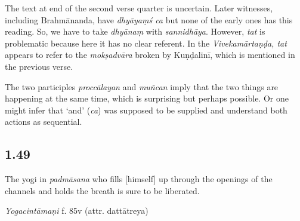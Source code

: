 \begin{ekdosis}
\begin{testimonia}[hp01_048]
\end{testimonia}

\begin{philcomm}[hp01_048]

The text at end of the second verse quarter is uncertain. Later witnesses, including Brahmānanda, have \emph{dhyāyaṃś ca} but none of the early ones has this reading. So, we have to take \emph{dhyānaṃ} with \emph{sannidhāya}. However, \emph{tat} is problematic because here it has no clear referent. In the \emph{Vivekamārtaṇḍa, tat} appears to refer to the \emph{mokṣadvāra} broken by Kuṇḍalinī, which is mentioned in the previous verse. 

The two participles \emph{proccālayan} and \emph{muñcan} imply that the two things are happening at the same time, which is surprising but perhaps possible. Or one might infer that `and' (\emph{ca}) was supposed to be supplied and understand both actions as sequential.

\end{philcomm}

\subsection*{1.49}
\begin{translation}[hp01_049]
The yogi in \emph{padmāsana} who fills [himself] up through the openings of the channels and holds the breath is sure to be liberated.
\end{translation}


\begin{testimonia}[hp01_049]
\emph{Yogacintāmaṇi} f. 85v (attr. dattātreya)

\begin{versinnote}
\end{versinnote}


\end{testimonia}
\end{ekdosis}
